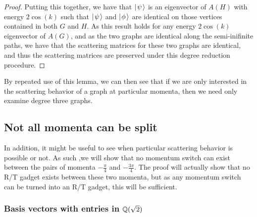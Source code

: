 \documentclass[../thesis-main/thesis-main]{subfiles}
\begin{document}
\begin{proof}
  Putting this together, we have that $|\mspace{2mu} \psi \mspace{2mu} \rangle$ is an eigenvector of $A(H)$ with energy $2\cos(k)$ such that $|\mspace{2mu} \psi \mspace{2mu} \rangle$ and $|\mspace{2mu} \phi \mspace{2mu} \rangle$ are identical on those vertices contained in both $G$ and $H$.  As this result holds for any energy $2\cos(k)$ eigenvector of $A(G)$, and as the two graphs are identical along the semi-inifinite paths, we have that the scattering matrices for these two graphs are identical, and thus the scattering matrices are preserved under this degree reduction procedure.
\end{proof}

By repeated use of this lemma, we can then see that if we are only interested in the scattering behavior of a graph at particular momenta, then we need only examine degree three graphs.



\subsection{Not all momenta can be split}

In addition, it might be useful to see when particular scattering behavior is possible or not.  As such ,we will show that no momentum switch can exist between the pairs of momenta $-\frac{\pi}{4}$ and $-\frac{3\pi}{4}$.  The proof will actually show that no R/T gadget exists between these two momenta, but as any momentum switch can be turned into an R/T gadget, this will be sufficient.


\subsubsection{Basis vectors with entries in $\mathbb{Q}(\sqrt{2})$}
\label{sec:vecs_over_field}
\end{document}
